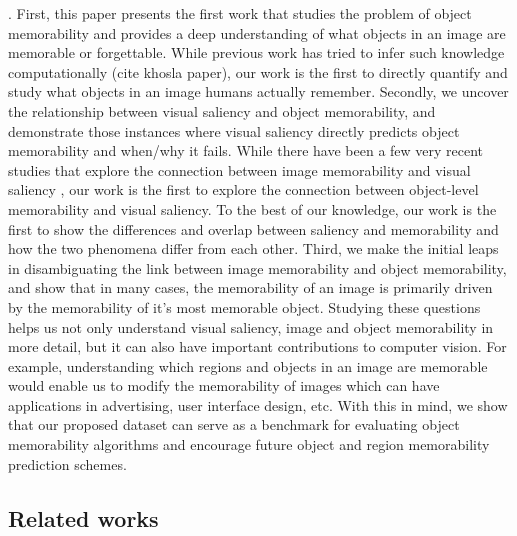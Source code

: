 . First, this paper presents the first work that studies the problem of object memorability and provides a deep understanding of what objects in an image are memorable or forgettable. While previous work has tried to infer such knowledge  computationally (cite khosla paper), our work is the first to directly quantify and study what objects in an image humans actually remember.  Secondly, we uncover the relationship between visual saliency and object memorability, and demonstrate those instances where visual saliency directly predicts object memorability and when/why it fails. While there have been a few very recent studies that explore the connection between image memorability and visual saliency \cite{zoya15,lemeur13}, our work is the first to explore the connection between object-level memorability and visual saliency. To the best of our knowledge, our work is the first to show the differences and overlap between saliency and memorability and how the two phenomena differ from each other.  Third, we make the initial leaps in disambiguating the link between image memorability and object memorability, and show that in many cases, the memorability of an image is primarily driven by the memorability of it’s most memorable object. Studying these questions helps us not only understand visual saliency, image and object memorability in more detail, but it can also have important contributions to computer vision. For example, understanding which regions and objects in an image are memorable would enable us to modify the memorability of images which can have applications in advertising, user interface design, etc. With this in mind, we show that our proposed dataset can serve as a benchmark for evaluating object memorability algorithms and encourage future object and region memorability prediction schemes.


\subsection{Related works}

